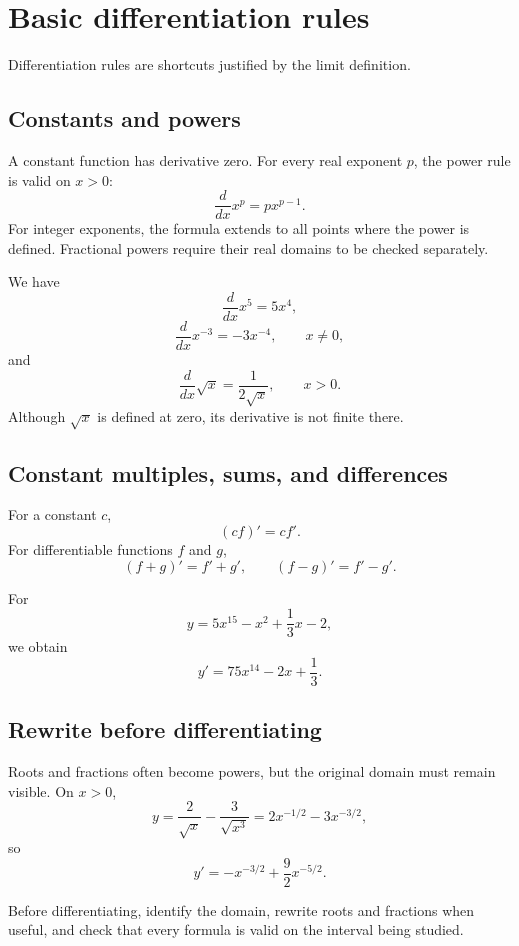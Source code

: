 \section{Basic differentiation rules}

Differentiation rules are shortcuts justified by the limit definition.

\subsection*{Constants and powers}

A constant function has derivative zero. For every real exponent \(p\), the power rule is valid on \(x>0\):
\[
\frac{d}{dx}x^p=px^{p-1}.
\]
For integer exponents, the formula extends to all points where the power is defined. Fractional powers require their real domains to be checked separately.

\begin{examplebox}
We have
\[
\frac{d}{dx}x^5=5x^4,
\]
\[
\frac{d}{dx}x^{-3}=-3x^{-4},
\qquad x\ne0,
\]
and
\[
\frac{d}{dx}\sqrt{x}=\frac1{2\sqrt{x}},
\qquad x>0.
\]
Although \(\sqrt{x}\) is defined at zero, its derivative is not finite there.
\end{examplebox}

\subsection*{Constant multiples, sums, and differences}

For a constant \(c\),
\[
(cf)'=cf'.
\]
For differentiable functions \(f\) and \(g\),
\[
(f+g)'=f'+g',
\qquad
(f-g)'=f'-g'.
\]

\begin{examplebox}
For
\[
y=5x^{15}-x^2+\frac13x-2,
\]
we obtain
\[
y'=75x^{14}-2x+\frac13.
\]
\end{examplebox}

\subsection*{Rewrite before differentiating}

Roots and fractions often become powers, but the original domain must remain visible. On \(x>0\),
\[
y=\frac2{\sqrt{x}}-\frac3{\sqrt{x^3}}
=2x^{-1/2}-3x^{-3/2},
\]
so
\[
y'=-x^{-3/2}+\frac92x^{-5/2}.
\]

\begin{summarybox}
Before differentiating, identify the domain, rewrite roots and fractions when useful, and check that every formula is valid on the interval being studied.
\end{summarybox}
